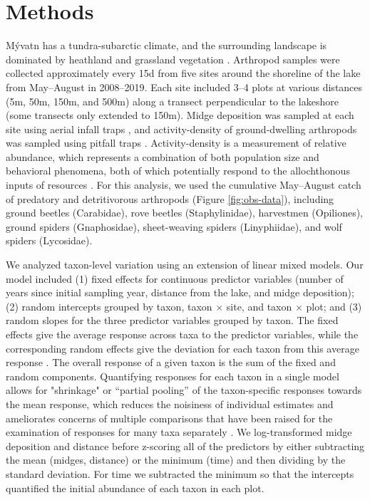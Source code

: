 \section*{Methods}

M\'{y}vatn has a tundra-subarctic climate, and the surrounding landscape is
dominated by heathland and grassland vegetation \citep{Einarsson2004}.
Arthropod samples were collected approximately every 15d from five sites around the
shoreline of the lake from May--August in 2008--2019.
Each site included 3--4 plots at various distances
(5m, 50m, 150m, and 500m) along a transect perpendicular to the lakeshore
(some transects only extended to 150m).
Midge deposition was sampled at each site using aerial infall traps \citep{Dreyer2015},
and activity-density of ground-dwelling arthropods was sampled using pitfall traps
\citep{Southwood2009}.
Activity-density is a measurement of relative abundance, which represents a combination
of both population size and behavioral phenomena, both of which potentially respond
to the allochthonous inputs of resources \citep{Ostfeld2000}.
For this analysis, we used the cumulative May--August catch of predatory and
detritivorous arthropods (Figure \ref{fig:obs-data}),
including ground beetles (Carabidae), rove beetles (Staphylinidae),
harvestmen (Opiliones), ground spiders (Gnaphosidae),
sheet-weaving spiders (Linyphiidae), and wolf spiders (Lycosidae).



We analyzed taxon-level variation using an extension of
linear mixed models.
Our model included (1) fixed effects for continuous predictor variables 
(number of years since initial sampling year, distance from the lake, and midge deposition);
(2) random intercepts grouped by taxon, taxon $\times$ site, and taxon $\times$ plot; and
(3) random slopes for the three predictor variables grouped by taxon.
The fixed effects give the average response across taxa to the predictor variables,
while the corresponding random effects give the deviation for each taxon from this
average response \citep{Jackson2012}.
The overall response of a given taxon is the sum of the fixed and random components.
Quantifying responses for each taxon in a single model 
allows for "shrinkage" or “partial pooling” of the taxon-specific responses towards the mean response,
which reduces the noisiness of individual estimates and ameliorates concerns of multiple
comparisons \citep{Gelman2012} that have been raised for the examination of
responses for many taxa separately \citep{Mcgarigal2013}.
We log-transformed midge deposition and distance 
before z-scoring all of the predictors
by either subtracting the mean (midges, distance) or the minimum (time)
and then dividing by the standard deviation.
For time we subtracted the minimum so that the intercepts 
quantified the initial abundance of each taxon in each plot.



